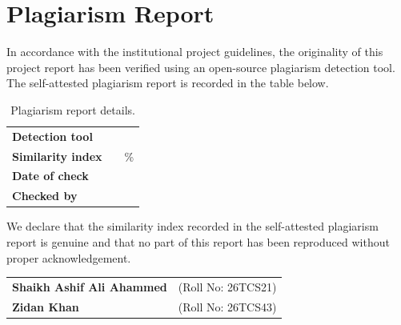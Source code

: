 \chapter*{Plagiarism Report}

In accordance with the institutional project guidelines, the originality of
this project report has been verified using an open-source plagiarism
detection tool. The self-attested plagiarism report is recorded in the table
below.

\begin{table}[H]
\centering
\caption{Plagiarism report details.}
\small
\begin{tabular}{ll}
\toprule
\textbf{Detection tool} & \\
\textbf{Similarity index} & \ \hrulefill\ \% \\
\textbf{Date of check} & \\
\textbf{Checked by} & \\
\bottomrule
\end{tabular}
\end{table}

We declare that the similarity index recorded in the self-attested
plagiarism report is genuine and that no part of this report has been
reproduced without proper acknowledgement.

\vspace{1.8cm}

\begin{tabular}{ll}
\textbf{Shaikh Ashif Ali Ahammed} & (Roll No: 26TCS21) \\
\textbf{Zidan Khan}                & (Roll No: 26TCS43) \\
\end{tabular}